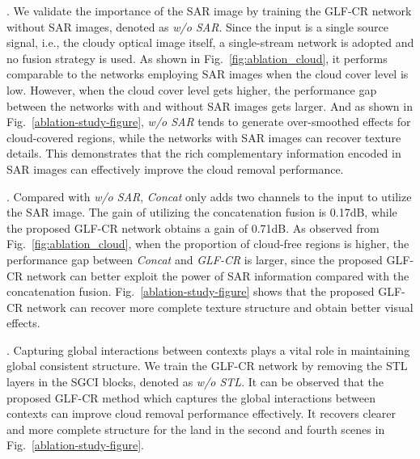 \documentclass[a4paper,fleqn]{cas-dc}
\newcommand{\ie}[1]{{i.e.}}
\begin{document}
. 
We validate the importance of the SAR image by training the GLF-CR network without SAR images, 
denoted as {\it w/o SAR}. Since the input is a single source signal, \ie{}, the cloudy optical image itself, a single-stream network is adopted and no fusion strategy is used. 
As shown in Fig.~\ref{fig:ablation_cloud}, it performs comparable to the networks employing SAR images when the cloud cover level is low. However, when the cloud cover level gets higher, the performance gap between the networks with and without SAR images gets larger.
And as shown in Fig.~\ref{ablation-study-figure}, {\it w/o SAR} tends to generate over-smoothed effects for cloud-covered regions, while the networks with SAR images can recover texture details. This demonstrates that the rich complementary information encoded in SAR images can effectively improve the cloud removal performance. 

.  Compared with {\it w/o SAR}, {\it Concat} only adds two channels to the input to utilize the SAR image. 
The gain of utilizing the concatenation fusion is 0.17dB, while the proposed GLF-CR network obtains a gain of 0.71dB. As observed from Fig.~\ref{fig:ablation_cloud}, when the proportion of cloud-free regions is higher, the performance gap between {\it Concat} and {\it GLF-CR} is larger, since the proposed GLF-CR network can better exploit the power of SAR information compared with the concatenation fusion.
Fig.~\ref{ablation-study-figure} shows that the proposed GLF-CR network can recover more complete texture structure and obtain better visual effects. 


. Capturing global interactions between contexts plays a vital role in maintaining global consistent structure. 
We train the GLF-CR network by removing the STL layers in the SGCI blocks, denoted as {\it w/o STL}. 
It can be observed that the proposed GLF-CR method which captures the global interactions between contexts can improve cloud removal performance effectively. 
It recovers clearer and more complete structure for the land in the second and fourth scenes in Fig.~\ref{ablation-study-figure}.
\end{document}
